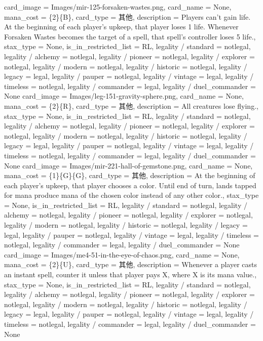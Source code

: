 \documentclass[lang = cn, color = black, 10pt]{AllThatStax}
\begin{document}
\card
{
	card_image = Images/mir-125-forsaken-wastes.png,
	card_name = None,
	mana_cost = \{2\}\{B\},
	card_type = 其他,
	description = Players can't gain life.
	At the beginning of each player's upkeep, that player loses 1 life.
	Whenever Forsaken Wastes becomes the target of a spell, that spell's controller loses 5 life.,
	stax_type = None,
	is_in_restricted_list = RL,
	legality / standard = notlegal,
	legality / alchemy = notlegal,
	legality / pioneer = notlegal,
	legality / explorer = notlegal,
	legality / modern = notlegal,
	legality / historic = notlegal,
	legality / legacy = legal,
	legality / pauper = notlegal,
	legality / vintage = legal,
	legality / timeless = notlegal,
	legality / commander = legal,
	legality / duel_commander = None
}
\card
{
	card_image = Images/leg-151-gravity-sphere.png,
	card_name = None,
	mana_cost = \{2\}\{R\},
	card_type = 其他,
	description = All creatures lose flying.,
	stax_type = None,
	is_in_restricted_list = RL,
	legality / standard = notlegal,
	legality / alchemy = notlegal,
	legality / pioneer = notlegal,
	legality / explorer = notlegal,
	legality / modern = notlegal,
	legality / historic = notlegal,
	legality / legacy = legal,
	legality / pauper = notlegal,
	legality / vintage = legal,
	legality / timeless = notlegal,
	legality / commander = legal,
	legality / duel_commander = None
}
\card
{
	card_image = Images/mir-221-hall-of-gemstone.png,
	card_name = None,
	mana_cost = \{1\}\{G\}\{G\},
	card_type = 其他,
	description = At the beginning of each player's upkeep, that player chooses a color. Until end of turn, lands tapped for mana produce mana of the chosen color instead of any other color.,
	stax_type = None,
	is_in_restricted_list = RL,
	legality / standard = notlegal,
	legality / alchemy = notlegal,
	legality / pioneer = notlegal,
	legality / explorer = notlegal,
	legality / modern = notlegal,
	legality / historic = notlegal,
	legality / legacy = legal,
	legality / pauper = notlegal,
	legality / vintage = legal,
	legality / timeless = notlegal,
	legality / commander = legal,
	legality / duel_commander = None
}
\card
{
	card_image = Images/me4-51-in-the-eye-of-chaos.png,
	card_name = None,
	mana_cost = \{2\}\{U\},
	card_type = 其他,
	description = Whenever a player casts an instant spell, counter it unless that player pays {X}, where X is its mana value.,
	stax_type = None,
	is_in_restricted_list = RL,
	legality / standard = notlegal,
	legality / alchemy = notlegal,
	legality / pioneer = notlegal,
	legality / explorer = notlegal,
	legality / modern = notlegal,
	legality / historic = notlegal,
	legality / legacy = legal,
	legality / pauper = notlegal,
	legality / vintage = legal,
	legality / timeless = notlegal,
	legality / commander = legal,
	legality / duel_commander = None
}
\end{document}
